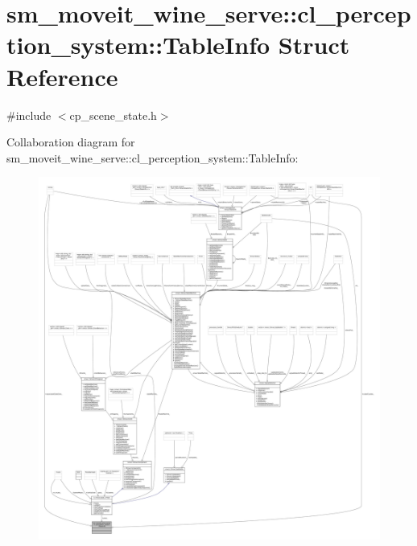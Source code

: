 \hypertarget{structsm__moveit__wine__serve_1_1cl__perception__system_1_1TableInfo}{}\section{sm\+\_\+moveit\+\_\+wine\+\_\+serve\+:\+:cl\+\_\+perception\+\_\+system\+:\+:Table\+Info Struct Reference}
\label{structsm__moveit__wine__serve_1_1cl__perception__system_1_1TableInfo}


{\ttfamily \#include $<$cp\+\_\+scene\+\_\+state.\+h$>$}



Collaboration diagram for sm\+\_\+moveit\+\_\+wine\+\_\+serve\+:\+:cl\+\_\+perception\+\_\+system\+:\+:Table\+Info\+:
\nopagebreak
\begin{figure}[H]
\begin{center}
\leavevmode
\includegraphics[width=350pt]{structsm__moveit__wine__serve_1_1cl__perception__system_1_1TableInfo__coll__graph}
\end{center}
\end{figure}
